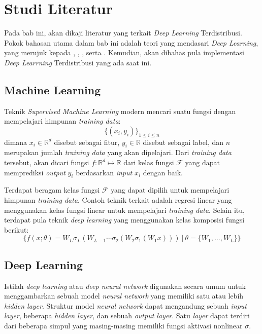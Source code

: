 \chapter{Studi Literatur}
Pada bab ini, akan dikaji literatur yang terkait \emph{Deep Learning} Terdistribusi. Pokok bahasan utama dalam bab ini adalah teori yang mendasari \emph{Deep Learning}, yang merujuk kepada \textcite{JiangDistributed}, \textcite{Choi2019}, \textcite{Fan2019}, serta \textcite{LeCun2015}. Kemudian, akan dibahas pula implementasi \emph{Deep Learrning} Terdistribusi yang ada saat ini.

\section{Machine Learning}
Teknik \emph{Supervised Machine Learning} modern mencari suatu fungsi dengan mempelajari himpunan \emph{training data}:
\begin{equation}
\{(x_i, y_i)\}_{1 \le i \le n}
\end{equation}
dimana $x_i \in \mathbb{R}^d$ disebut sebagai fitur,  $y_i \in \mathbb{R}$ disebut sebagai label, dan $n$ merupakan jumlah \emph{training data} yang akan dipelajari. Dari \emph{training data} tersebut, akan dicari fungsi $f: \mathbb{R}^d \mapsto \mathbb{R}$ dari kelas fungsi $\mathcal{F}$ yang dapat memprediksi \emph{output} $y_i$ berdasarkan \emph{input} $x_i$ dengan baik.

Terdapat beragam kelas fungsi \(\mathcal{F}\) yang dapat dipilih untuk mempelajari himpunan \emph{training data}. Contoh teknik terkait adalah regresi linear yang menggunakan kelas fungsi linear untuk mempelajari \emph{training data}. Selain itu, terdapat pula teknik \emph{deep learning} yang menggunakan kelas komposisi fungsi berikut:
\begin{equation}
\{
  f(x;\theta) = W_L\sigma_L(W_{L-1} \cdots \sigma_2(W_2\sigma_1(W_1 x)))\ \vert \ \theta = \{W_1,\dots,W_L\}
\}
\end{equation}

\section{Deep Learning}
Istilah \emph{deep learning} atau \emph{deep neural network} digunakan secara umum untuk menggambarkan sebuah model \emph{neural network} yang memiliki satu atau lebih \emph{hidden layer}. Struktur model \emph{neural network} dapat mengandung sebuah \emph{input layer}, beberapa \emph{hidden layer}, dan sebuah \emph{output layer}. Satu \emph{layer} dapat terdiri dari beberapa simpul yang masing-masing memiliki fungsi aktivasi nonlinear $\sigma$.

